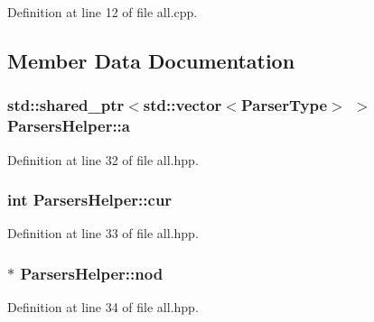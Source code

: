 Definition at line 12 of file all.\+cpp.



\subsection{Member Data Documentation}
\hypertarget{class_parsers_helper_a1c30abdf7ce5ad7d5e67237f88f18223}{}
\subsubsection[{a}]{\setlength{\rightskip}{0pt plus 5cm}std\+::shared\+\_\+ptr$<$std\+::vector$<${\bf Parser\+Type}$>$ $>$ Parsers\+Helper\+::a\hspace{0.3cm}{\ttfamily [private]}}\label{class_parsers_helper_a1c30abdf7ce5ad7d5e67237f88f18223}


Definition at line 32 of file all.\+hpp.

\hypertarget{class_parsers_helper_a51c199f259d9aadab7d02681c9e57c49}{}
\subsubsection[{cur}]{\setlength{\rightskip}{0pt plus 5cm}int Parsers\+Helper\+::cur\hspace{0.3cm}{\ttfamily [private]}}\label{class_parsers_helper_a51c199f259d9aadab7d02681c9e57c49}


Definition at line 33 of file all.\+hpp.

\hypertarget{class_parsers_helper_a241ca292b5a231634a4486120c1d4b9f}{}
\subsubsection[{nod}]{$\ast$ Parsers\+Helper\+::nod\hspace{0.3cm}{\ttfamily [private]}}\label{class_parsers_helper_a241ca292b5a231634a4486120c1d4b9f}


Definition at line 34 of file all.\+hpp.

\hypertarget{class_parsers_helper_a88e598a10d698b0962efa12ee6121436}{}
